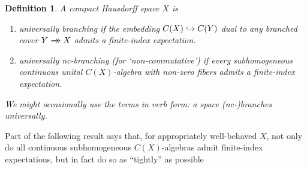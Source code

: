 \documentclass[11pt,leqno]{article}
\theoremstyle{plain}
\theoremstyle{plain}
\theoremstyle{plain}
\newtheorem{definition}[lemma]{Definition}
\numberwithin{equation}{section}
\theoremstyle{nonumberplain}
\newcommand\1{{\bf 1}}
\newcommand{\xrightarrowdbl}[2][]{%
  \xrightarrow[#1]{#2}\mathrel{\mkern-14mu}\rightarrow
}
\begin{document}
\begin{definition}\label{def:brnching}
  A compact Hausdorff space $X$ is
  \begin{enumerate}[(1),wide]
  \item\label{item:def:brnching:cls} {\it universally branching} if the embedding $C(X)\lhook\joinrel\to C(Y)$ dual to any branched cover $Y\xrightarrowdbl{}X$ admits a finite-index expectation.

  \item\label{item:def:brnching:nc} {\it universally nc-branching} (for `non-commutative') if every subhomogeneous continuous unital $C(X)$-algebra with non-zero fibers admits a finite-index expectation. 
  \end{enumerate}
  We might occasionally use the terms in verb form: a space {\it (nc-)branches universally}.   
\end{definition}

Part  of the following result says that, for appropriately well-behaved $X$, not only do all continuous subhomogeneous $C(X)$-algebras admit finite-index expectations, but in fact do so as ``tightly'' as possible
\end{document}
